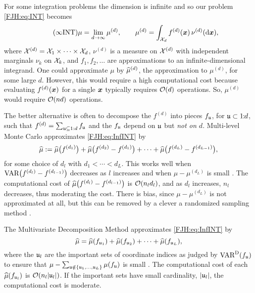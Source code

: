 \documentclass[graybox,footinfo]{svmult}
\begin{document}
\begin{FJHLesson}
	\FJHLessonTwelve
\end{FJHLesson}

For some integration problems the dimension is infinite and so our problem \eqref{FJH:eq:INT} 
becomes
\begin{equation} \label{FJH:eq:InfINT} \tag{$\infty$INT}
\mu = \lim_{d \to \infty} \mu^{(d)}, \qquad \mu^{(d)} = \int_{\calX_d} f^{(d)}(\bsx) \, 
\nu^{(d)}(\D 
\bsx),
\end{equation} 
where ${\mathcal{X}}^{(d)} = {\mathcal{X}}_1 \times \cdots \times {\mathcal{X}}_d$, $\nu^{(d)}$ is a measure on 
${\mathcal{X}}^{(d)} $ 
with 
independent marginals $\nu_k$ on ${\mathcal{X}}_k$, and $f_1, f_2, \ldots$ are approximations to 
an 
infinite-dimensional integrand.  One could approximate $\mu$ by $\widehat{\mu}^{(d)}$, the 
approximation 
to 
$\mu^{(d)}$, for some large $d$.  However, this would  require a high computational cost 
because evaluating $f^{(d)}({\boldsymbol{x}})$ for a single ${\boldsymbol{x}}$ typically requires ${\mathcal{O}}(d)$ 
operations.  So, $\mu^{(d)}$ would require ${\mathcal{O}}(nd)$ operations.

The better alternative is often to decompose the $f^{(d)}$ into pieces $f_{\mathfrak{u}}$, for ${\mathfrak{u}} 
\subset 
1 \!\!:\!\! d$, such that $f^{(d)} = \sum_{{\mathfrak{u}} \subseteq 1:d} f_{{\mathfrak{u}}}$ and the 
$f_{\mathfrak{u}}$ depend on ${\mathfrak{u}}$ but \emph{not on $d$}.  Multi-level Monte Carlo 
approximates \eqref{FJH:eq:InfINT} by
\begin{equation*}
\widehat{\mu} := \widehat{\mu}\bigl(f^{(d_1)}\bigr) + \widehat{\mu}\bigl(f^{(d_2)} - f^{(d_1)}\bigr) + 
\cdots + \widehat{\mu}\bigl(f^{(d_L)} - f^{(d_{L-1})}\bigr), 
\end{equation*}
for some choice of $d_l$ with $d_1 < \cdots < d_L$.  This works well when 
$\textup{VAR}\bigl(f^{(d_l)} 
- f^{(d_{l-1} )} \bigr)$ decreases as $l$ increases and when $\mu - \mu^{(d_L)}$ is small 
\cite{
	Gil14a, Gil15a, Gil08b, Hei01a,  HicMGRitNiu09a, NiuHic09b}.  The computational cost of 
	$\widehat{\mu}\bigl(f^{(d_l)} - 
f^{(d_{l-1})} \bigr)$ is ${\mathcal{O}}(n_l d_l)$, and as $d_l$ increases, $n_l$ decreases, thus 
moderating the cost.   There is bias, since 
$\mu - 
	\mu^{(d_L)}$ is not approximated at all, but this can be removed by a clever a randomized 
	sampling method \cite{RheGly12a}.
	
The Multivariate Decomposition Method approximates \eqref{FJH:eq:InfINT} by
\begin{equation*}
\widehat{\mu} = \widehat{\mu}(f_{{\mathfrak{u}}_1}) + \widehat{\mu}(f_{{\mathfrak{u}}_2}) + 
		\cdots +\widehat{\mu}(f_{{\mathfrak{u}}_L}),
\end{equation*} 
where the ${\mathfrak{u}}_l$ are the important sets of coordinate indices as judged by 
$\textup{VAR}^{\textup{D}}(f_{\mathfrak{u}})$ to ensure that $\mu - \sum_{{\mathfrak{u}} \notin \{{\mathfrak{u}}_1,   \ldots, 
	{\mathfrak{u}}_L\}} \mu(f_{\mathfrak{u}})$ is small \cite{Was13b}.  The computational cost of each 
	$\widehat{\mu}(f_{{\mathfrak{u}}_l})$ 
is ${\mathcal{O}}(n_l \lvert {\mathfrak{u}}_l \rvert)$.  If the important sets have small cardinality, 
$\lvert {\mathfrak{u}}_l \rvert$, the computational cost is moderate.  
\end{document}
